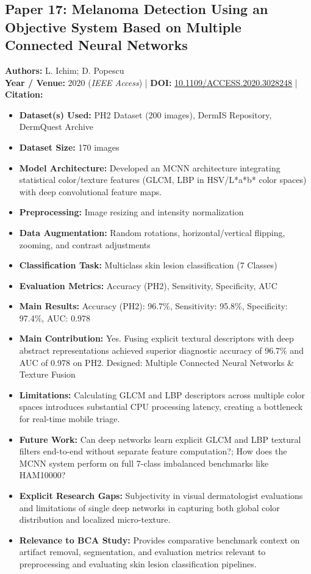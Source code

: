 \documentclass[11pt,a4paper]{article}
\begin{document}
\subsection{Paper 17: Melanoma Detection Using an Objective System Based on Multiple Connected Neural Networks}
\textbf{Authors:} L. Ichim; D. Popescu \\
\textbf{Year / Venue:} 2020 (\textit{IEEE Access}) | \textbf{DOI:} \href{https://doi.org/10.1109/ACCESS.2020.3028248}{10.1109/ACCESS.2020.3028248} | \textbf{Citation:} \cite{9210626}

\begin{itemize}\small
\item \textbf{Dataset(s) Used:} PH2 Dataset (200 images), DermIS Repository, DermQuest Archive
\item \textbf{Dataset Size:} 170 images
\item \textbf{Model Architecture:} Developed an MCNN architecture integrating statistical color/texture features (GLCM, LBP in HSV/L*a*b* color spaces) with deep convolutional feature maps.
\item \textbf{Preprocessing:} Image resizing and intensity normalization
\item \textbf{Data Augmentation:} Random rotations, horizontal/vertical flipping, zooming, and contrast adjustments
\item \textbf{Classification Task:} Multiclass skin lesion classification (7 Classes)
\item \textbf{Evaluation Metrics:} Accuracy (PH2), Sensitivity, Specificity, AUC
\item \textbf{Main Results:} Accuracy (PH2): 96.7\%, Sensitivity: 95.8\%, Specificity: 97.4\%, AUC: 0.978
\item \textbf{Main Contribution:} Yes. Fusing explicit textural descriptors with deep abstract representations achieved superior diagnostic accuracy of 96.7\% and AUC of 0.978 on PH2. Designed: Multiple Connected Neural Networks \& Texture Fusion
\item \textbf{Limitations:} Calculating GLCM and LBP descriptors across multiple color spaces introduces substantial CPU processing latency, creating a bottleneck for real-time mobile triage.
\item \textbf{Future Work:} Can deep networks learn explicit GLCM and LBP textural filters end-to-end without separate feature computation?; How does the MCNN system perform on full 7-class imbalanced benchmarks like HAM10000?
\item \textbf{Explicit Research Gaps:} Subjectivity in visual dermatologist evaluations and limitations of single deep networks in capturing both global color distribution and localized micro-texture.
\item \textbf{Relevance to BCA Study:} Provides comparative benchmark context on artifact removal, segmentation, and evaluation metrics relevant to preprocessing and evaluating skin lesion classification pipelines.
\end{itemize}
\end{document}
